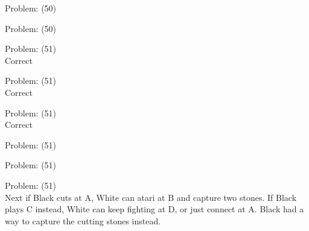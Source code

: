 \documentclass[11pt]{article}
\begin{document}
\begin{minipage}[t]{0.5\textwidth}
  {\centering
  
  Problem: (50)\\
  
  }
\end{minipage}
\begin{minipage}[t]{0.5\textwidth}
  {\centering
  
  Problem: (50)\\
  
  }
\end{minipage}
\begin{minipage}[t]{0.5\textwidth}
  {\centering
  
  Problem: (51)\\
  Correct\\
  }
\end{minipage}
\begin{minipage}[t]{0.5\textwidth}
  {\centering
  
  Problem: (51)\\
  Correct\\
  }
\end{minipage}
\begin{minipage}[t]{0.5\textwidth}
  {\centering
  
  Problem: (51)\\
  Correct\\
  }
\end{minipage}
\begin{minipage}[t]{0.5\textwidth}
  {\centering
  
  Problem: (51)\\
  
  }
\end{minipage}
\begin{minipage}[t]{0.5\textwidth}
  {\centering
  
  Problem: (51)\\
  
  }
\end{minipage}
\begin{minipage}[t]{0.5\textwidth}
  {\centering
  
  Problem: (51)\\
  Next if Black cuts at A, White can atari at B and capture two stones. If Black plays C instead, White can keep fighting at D, or just connect at A. Black had a way to capture the cutting stones instead.\\
  }
\end{minipage}
\end{document}
